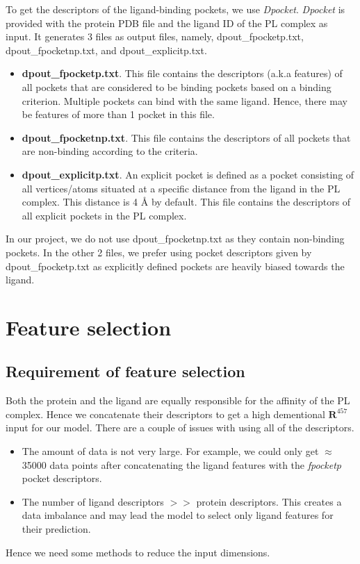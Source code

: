\documentclass[11pt]{article}
\begin{document}
To get the descriptors of the ligand-binding pockets,  we use \textit{Dpocket}.
\textit{Dpocket} is provided with the protein PDB file and the ligand ID of the PL complex as input.
It generates 3 files as output files,  namely,  dpout\_fpocketp.txt, dpout\_fpocketnp.txt,  and  dpout\_explicitp.txt.
\begin{itemize}
\item \textbf{dpout\_fpocketp.txt}.
This file contains the descriptors (a.k.a features) of all pockets that are considered to be binding pockets based on a binding criterion.
Multiple pockets can bind with the same ligand.
Hence,  there may be features of more than 1 pocket in this file.
\item \textbf{dpout\_fpocketnp.txt}.  This file contains the descriptors of all pockets that are non-binding according to the criteria.
\item \textbf{dpout\_explicitp.txt}.  An explicit pocket is defined as a pocket consisting of all vertices/atoms situated at a specific distance from the ligand in the PL complex.
This distance is 4 \r{A} by default.
This file contains the descriptors of all explicit pockets in the PL complex. 
\end{itemize}

In our project, we do not use dpout\_fpocketnp.txt as they contain non-binding pockets.
In the other 2 files,  we prefer using pocket descriptors given by dpout\_fpocketp.txt as explicitly defined pockets are heavily biased towards the ligand.

\section{Feature selection}
\subsection{Requirement of feature selection}
Both the protein and the ligand are equally responsible for the affinity of the PL complex.
Hence we concatenate their descriptors to get a high dementional $\mathbf{R}^{457}$ input for our model.
There are a couple of issues with using all of the descriptors.
\begin{itemize}
\item The amount of data is not very large. 
For example,  we could only get $\approx$ 35000 data points after concatenating the ligand features with the \textit{fpocketp} pocket descriptors.
\item The number of ligand descriptors $>>$ protein descriptors.
This creates a data imbalance and may lead the model to select only ligand features for their prediction.
\end{itemize}
Hence we need some methods to reduce the input dimensions.
\end{document}
